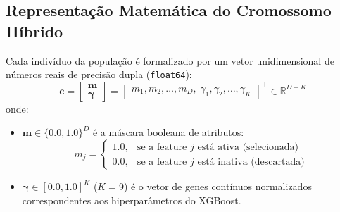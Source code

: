 \documentclass[11pt,a4paper]{article}
\begin{document}
\subsection{Representação Matemática do Cromossomo Híbrido}
Cada indivíduo da população é formalizado por um vetor unidimensional de números reais de precisão dupla (\texttt{float64}):
\begin{equation}
  \mathbf{c} = \begin{bmatrix} \mathbf{m} \\ \boldsymbol{\gamma} \end{bmatrix} = \begin{bmatrix} m_1, m_2, \dots, m_D, \; \gamma_1, \gamma_2, \dots, \gamma_K \end{bmatrix}^\top \in \mathbb{R}^{D + K}
  \label{eq:cromossomo}
\end{equation}
onde:
\begin{itemize}
  \item $\mathbf{m} \in \{0.0, 1.0\}^D$ é a máscara booleana de atributos:
  \begin{equation}
    m_j = \begin{cases} 1.0, & \text{se a feature } j \text{ está ativa (selecionada)} \\ 0.0, & \text{se a feature } j \text{ está inativa (descartada)} \end{cases}
  \end{equation}
  \item $\boldsymbol{\gamma} \in [0.0, 1.0]^K$ ($K=9$) é o vetor de genes contínuos normalizados correspondentes aos hiperparâmetros do XGBoost.
\end{itemize}
\end{document}
